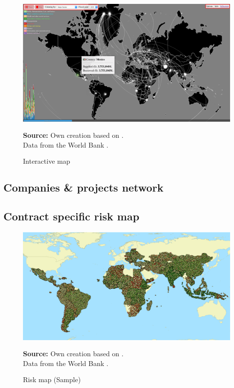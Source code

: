 \begin{figure}[H]
\begin{center}
\caption{Interactive map}
\label{fig_interactive_map}
\includegraphics[width=\textwidth,height=1\textheight,keepaspectratio]{../img/interactive_map_mex.pdf}
\end{center}
\noindent \footnotesize{\textbf{Source:} Own creation based on \cite{wb_i_map}. \\Data from the World Bank \parencite{wb_data}.}
\end{figure}

\subsection{Companies \& projects network}


\subsection{Contract specific risk map}

\begin{figure}[H]
\begin{center}
\caption{Risk map (Sample)}
\label{fig_risk_map}
\includegraphics[width=\textwidth,height=1\textheight,keepaspectratio]{../img/risk_map.pdf}
\end{center}
\noindent \footnotesize{\textbf{Source:} Own creation based on \cite{wb_i_map}. \\Data from the World Bank \parencite{wb_data}.}
\end{figure}

